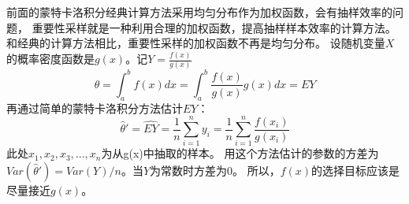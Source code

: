   前面的蒙特卡洛积分经典计算方法采用均匀分布作为加权函数，会有抽样效率的问题，
  重要性采样就是一种利用合理的加权函数，提高抽样样本效率的计算方法。
  和经典的计算方法相比，重要性采样的加权函数不再是均匀分布。
  设随机变量$X$的概率密度函数是$g(x)$。记$Y=\frac{f(x)}{g(x)}$
  \begin{equation}
      \theta=\int_a^b f(x)dx = \int_a^b \frac{f(x)}{g(x)}g(x)dx=EY
  \end{equation}
  再通过简单的蒙特卡洛积分方法估计$EY$：
  \begin{equation}
      \hat{\theta}'=\hat{EY}=\frac{1}{n}\sum_{i=1}^{n}y_i=\frac{1}{n}\sum_{i=1}^{n}\frac{f(x_i)}{g(x_i)}
  \end{equation}
  此处$x_1,x_2,x_3,...,x_n$为从g(x)中抽取的样本。
  用这个方法估计的参数的方差为
  $Var(\hat{\theta}')=Var(Y)/n$。当$Y$为常数时方差为0。
  所以，$f(x)$的选择目标应该是尽量接近$g(x)$。

